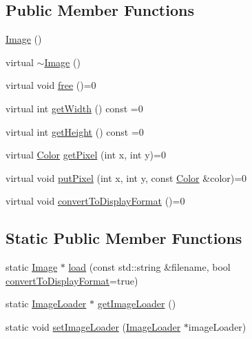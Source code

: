 \subsection*{Public Member Functions}
\begin{DoxyCompactItemize}
\item 
\hyperlink{classgcn_1_1Image_a883e7a2a2f9fdf12b671bbbcb31eb75d}{Image} ()
\item 
virtual \hyperlink{classgcn_1_1Image_aea3f86f45826db27d628bffb3c6bd26c}{$\sim$\+Image} ()
\item 
virtual void \hyperlink{classgcn_1_1Image_acfa8910bae0ed3402e9f1f9876e4c4cf}{free} ()=0
\item 
virtual int \hyperlink{classgcn_1_1Image_aa367cc8121c1f01a541e615b0a27497c}{get\+Width} () const =0
\item 
virtual int \hyperlink{classgcn_1_1Image_a09df6a36dc5a76a75a0dd5720f40ee0d}{get\+Height} () const =0
\item 
virtual \hyperlink{classgcn_1_1Color}{Color} \hyperlink{classgcn_1_1Image_a38e79120cc9f81bb36727e2859e04a09}{get\+Pixel} (int x, int y)=0
\item 
virtual void \hyperlink{classgcn_1_1Image_a4a023341cacd32ca4448ceec4b79be4a}{put\+Pixel} (int x, int y, const \hyperlink{classgcn_1_1Color}{Color} \&color)=0
\item 
virtual void \hyperlink{classgcn_1_1Image_a3e59862b9a8fdb2bd3cffd9ba39969af}{convert\+To\+Display\+Format} ()=0
\end{DoxyCompactItemize}
\subsection*{Static Public Member Functions}
\begin{DoxyCompactItemize}
\item 
static \hyperlink{classgcn_1_1Image}{Image} $\ast$ \hyperlink{classgcn_1_1Image_ad48bad2ddf8375c222e3731776baa786}{load} (const std\+::string \&filename, bool \hyperlink{classgcn_1_1Image_a3e59862b9a8fdb2bd3cffd9ba39969af}{convert\+To\+Display\+Format}=true)
\item 
static \hyperlink{classgcn_1_1ImageLoader}{Image\+Loader} $\ast$ \hyperlink{classgcn_1_1Image_ae7660b0958594f7d2287c887c71d3e2d}{get\+Image\+Loader} ()
\item 
static void \hyperlink{classgcn_1_1Image_aa042ca170fcce7fa019eed5475319d62}{set\+Image\+Loader} (\hyperlink{classgcn_1_1ImageLoader}{Image\+Loader} $\ast$image\+Loader)
\end{DoxyCompactItemize}
